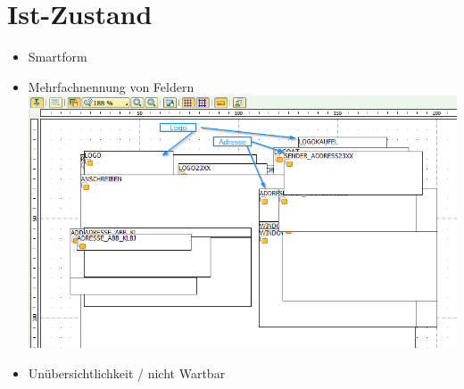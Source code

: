 \chapter{Ist-Zustand}

\begin{itemize}
	\item Smartform
	\item Mehrfachnennung von Feldern \\
	
	\includegraphics[width=0.65\paperwidth, height=0.4\paperheight]{img/Smartform-Beispiel-1.png}
	\item Unübersichtlichkeit / nicht Wartbar 
\end{itemize}